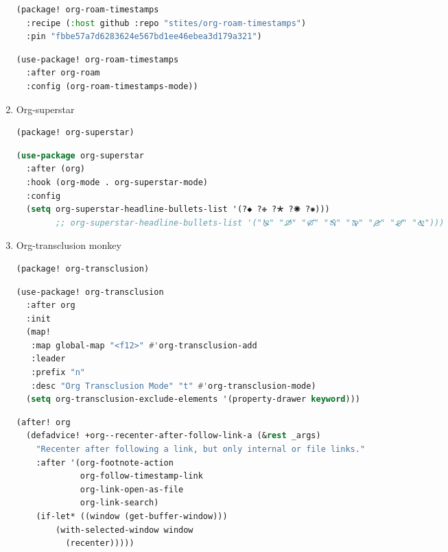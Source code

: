 \documentclass[11pt]{article}
\begin{document}
\begin{enumerate}
  \begin{lstlisting}[language=Lisp]
(package! org-roam-timestamps
  :recipe (:host github :repo "stites/org-roam-timestamps")
  :pin "fbbe57a7d6283624e567bd1ee46ebea3d179a321")
\end{lstlisting}

\begin{lstlisting}[language=Lisp]
(use-package! org-roam-timestamps
  :after org-roam
  :config (org-roam-timestamps-mode))
\end{lstlisting}
  \item Org-superstar
  \label{sec:org-superstar}

  \begin{lstlisting}[language=Lisp]
(package! org-superstar)
\end{lstlisting}

\begin{lstlisting}[language=Lisp]
(use-package org-superstar
  :after (org)
  :hook (org-mode . org-superstar-mode)
  :config
  (setq org-superstar-headline-bullets-list '(?◆ ?❉ ?🞱 ?🞽 ?✺)))
        ;; org-superstar-headline-bullets-list '("🙐" "🙑" "🙒" "🙓" "🙔" "🙕" "🙖" "🙗")))
\end{lstlisting}
  \item Org-transclusion\hfill{} monkey
  \label{sec:org-transclusion}

  \begin{lstlisting}[language=Lisp]
(package! org-transclusion)
\end{lstlisting}

\begin{lstlisting}[language=Lisp]
(use-package! org-transclusion
  :after org
  :init
  (map!
   :map global-map "<f12>" #'org-transclusion-add
   :leader
   :prefix "n"
   :desc "Org Transclusion Mode" "t" #'org-transclusion-mode)
  (setq org-transclusion-exclude-elements '(property-drawer keyword)))
\end{lstlisting}

\begin{lstlisting}[language=Lisp]
(after! org
  (defadvice! +org--recenter-after-follow-link-a (&rest _args)
    "Recenter after following a link, but only internal or file links."
    :after '(org-footnote-action
             org-follow-timestamp-link
             org-link-open-as-file
             org-link-search)
    (if-let* ((window (get-buffer-window)))
        (with-selected-window window
          (recenter)))))
\end{lstlisting}


\end{enumerate}
\end{document}
